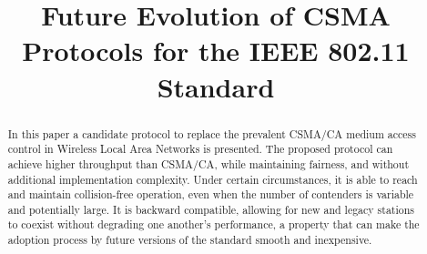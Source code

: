 \documentclass[conference]{IEEEtran}
\begin{document}
\title{Future Evolution of CSMA Protocols for the IEEE 802.11 Standard}


\author{
}





\maketitle


\begin{abstract}
In this paper a candidate protocol to replace the prevalent CSMA/CA medium access control in Wireless Local Area Networks is presented. The proposed protocol can achieve higher throughput than CSMA/CA, while maintaining fairness, and without additional implementation complexity. Under certain circumstances, it is able to reach and maintain collision-free operation, even when the number of contenders is variable and potentially large. It is backward compatible, allowing for new and legacy stations to coexist without degrading one another's performance, a property that can make the adoption process by future versions of the standard smooth and inexpensive.


\end{abstract}
\end{document}
